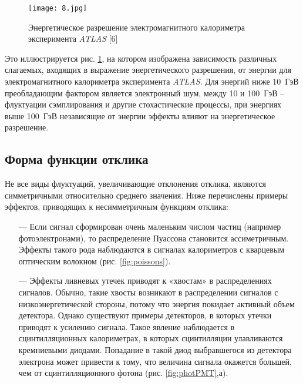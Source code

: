 \begin{figure}[H]
    \centering
    \texttt{[image: 8.jpg]}
    \caption{Энергетическое разрешение электромагнитного калориметра эксперимента \textit{ATLAS} [6]}
    \label{fig:resOnEn}
\end{figure}

Это  иллюстрируется  рис. \ref{fig:resOnEn},  на  котором  изображена  зависимость различных слагаемых, входящих в выражение энергетического разрешения, от  энергии для  электромагнитного  калориметра  эксперимента \textit{ATLAS}. Для энергий ниже \mbox{10 ГэВ} преобладающим фактором является электронный шум, между 10 и \mbox{100 ГэВ} – флуктуации сэмплирования и другие стохастические процессы,  при  энергиях  выше  \mbox{100  ГэВ}  независящие  от  энергии  эффекты влияют на энергетическое разрешение.

\subsection{Форма функции отклика} \label{chap2.3}

Не  все  виды  флуктуаций,  увеличивающие  отклонения  отклика, являются   симметричными   относительно   среднего   значения.   Ниже перечислены примеры эффектов, приводящих к несимметричным функциям отклика:

 \begin{itemize}[leftmargin=1.6\parindent, wide]
 	\item[---] Если сигнал сформирован очень маленьким числом частиц (например фотоэлектронами),  то  распределение  Пуассона  становится  ассиметричным. Эффекты  такого  рода  наблюдаются  в  сигналах  калориметров  с кварцевым оптическим волокном (рис. \ref{fig:poissons}).
 		\item[---] Эффекты ливневых утечек приводят к «хвостам» в распределениях сигналов.  Обычно,  такие  хвосты  возникают  в  распределении  сигналов  с низкоэнергетической стороны, потому что энергия покидает активный объем детектора.  Однако  существуют  примеры  детекторов,  в  которых  утечки приводят   к   усилению   сигнала.   Такое   явление   наблюдается   в сцинтилляционных  калориметрах,  в  которых  сцинтилляции  улавливаются кремниевыми диодами. Попадание в такой диод выбравшегося из детектора электрона может привести к тому, что величина сигнала окажется большей, чем от сцинтилляционного фотона (рис. \ref{fig:photPMT},а).
 \end{itemize}
 
